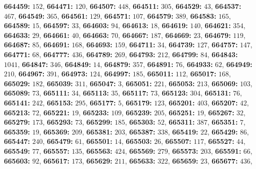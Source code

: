 \textsf{\bfseries 664459:} $152$, \textsf{\bfseries 664471:} $120$, \textsf{\bfseries 664507:} $448$, \textsf{\bfseries 664511:} $305$, \textsf{\bfseries 664529:} $43$, \textsf{\bfseries 664537:} $467$, \textsf{\bfseries 664549:} $365$, \textsf{\bfseries 664561:} $129$, \textsf{\bfseries 664571:} $107$, \textsf{\bfseries 664579:} $389$, \textsf{\bfseries 664583:} $165$, \textsf{\bfseries 664589:} $15$, \textsf{\bfseries 664597:} $33$, \textsf{\bfseries 664603:} $94$, \textsf{\bfseries 664613:} $18$, \textsf{\bfseries 664619:} $140$, \textsf{\bfseries 664621:} $354$, \textsf{\bfseries 664633:} $29$, \textsf{\bfseries 664661:} $40$, \textsf{\bfseries 664663:} $70$, \textsf{\bfseries 664667:} $187$, \textsf{\bfseries 664669:} $23$, \textsf{\bfseries 664679:} $119$, \textsf{\bfseries 664687:} $85$, \textsf{\bfseries 664691:} $168$, \textsf{\bfseries 664693:} $159$, \textsf{\bfseries 664711:} $34$, \textsf{\bfseries 664739:} $127$, \textsf{\bfseries 664757:} $147$, \textsf{\bfseries 664771:} $68$, \textsf{\bfseries 664777:} $436$, \textsf{\bfseries 664789:} $269$, \textsf{\bfseries 664793:} $212$, \textsf{\bfseries 664799:} $84$, \textsf{\bfseries 664843:} $1041$, \textsf{\bfseries 664847:} $346$, \textsf{\bfseries 664849:} $14$, \textsf{\bfseries 664879:} $357$, \textsf{\bfseries 664891:} $76$, \textsf{\bfseries 664933:} $62$, \textsf{\bfseries 664949:} $210$, \textsf{\bfseries 664967:} $391$, \textsf{\bfseries 664973:} $124$, \textsf{\bfseries 664997:} $185$, \textsf{\bfseries 665011:} $112$, \textsf{\bfseries 665017:} $168$, \textsf{\bfseries 665029:} $182$, \textsf{\bfseries 665039:} $311$, \textsf{\bfseries 665047:} $3$, \textsf{\bfseries 665051:} $221$, \textsf{\bfseries 665053:} $213$, \textsf{\bfseries 665069:} $103$, \textsf{\bfseries 665089:} $73$, \textsf{\bfseries 665111:} $34$, \textsf{\bfseries 665113:} $35$, \textsf{\bfseries 665117:} $73$, \textsf{\bfseries 665123:} $304$, \textsf{\bfseries 665131:} $76$, \textsf{\bfseries 665141:} $242$, \textsf{\bfseries 665153:} $295$, \textsf{\bfseries 665177:} $5$, \textsf{\bfseries 665179:} $123$, \textsf{\bfseries 665201:} $403$, \textsf{\bfseries 665207:} $42$, \textsf{\bfseries 665213:} $72$, \textsf{\bfseries 665221:} $19$, \textsf{\bfseries 665233:} $109$, \textsf{\bfseries 665239:} $205$, \textsf{\bfseries 665251:} $19$, \textsf{\bfseries 665267:} $32$, \textsf{\bfseries 665279:} $173$, \textsf{\bfseries 665293:} $73$, \textsf{\bfseries 665299:} $185$, \textsf{\bfseries 665303:} $52$, \textsf{\bfseries 665311:} $387$, \textsf{\bfseries 665351:} $7$, \textsf{\bfseries 665359:} $19$, \textsf{\bfseries 665369:} $209$, \textsf{\bfseries 665381:} $203$, \textsf{\bfseries 665387:} $338$, \textsf{\bfseries 665419:} $22$, \textsf{\bfseries 665429:} $86$, \textsf{\bfseries 665447:} $240$, \textsf{\bfseries 665479:} $61$, \textsf{\bfseries 665501:} $14$, \textsf{\bfseries 665503:} $26$, \textsf{\bfseries 665507:} $117$, \textsf{\bfseries 665527:} $44$, \textsf{\bfseries 665549:} $77$, \textsf{\bfseries 665557:} $135$, \textsf{\bfseries 665563:} $424$, \textsf{\bfseries 665569:} $279$, \textsf{\bfseries 665573:} $203$, \textsf{\bfseries 665591:} $66$, \textsf{\bfseries 665603:} $92$, \textsf{\bfseries 665617:} $173$, \textsf{\bfseries 665629:} $211$, \textsf{\bfseries 665633:} $322$, \textsf{\bfseries 665659:} $23$, \textsf{\bfseries 665677:} $436$, 
